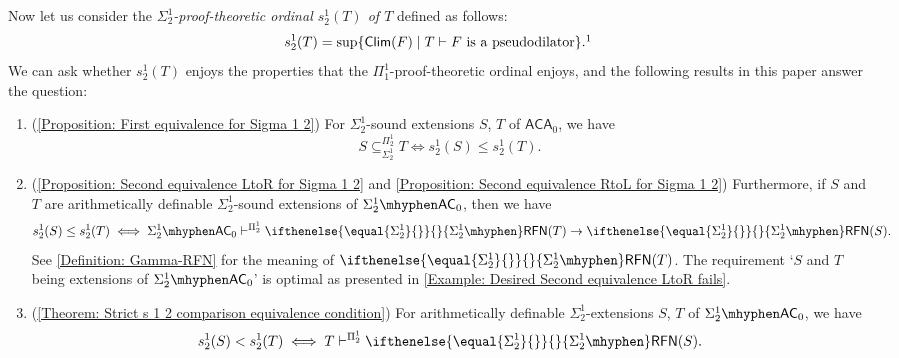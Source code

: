 \documentclass{mhkr}
\newcommand{\added}[1]{#1}
\newcommand{\Clim}{\mathsf{Clim}}
\newcommand{\RFN}[1][]{\ifthenelse{\equal{#1}{}}{}{#1\mhyphen}\mathsf{RFN}}
\newcommand{\AC}{\mathsf{AC}}
\newcommand{\ACA}{\mathsf{ACA}}
\begin{document}
Now let us consider the \emph{$\Sigma^1_2$-proof-theoretic ordinal $s^1_2(T)$ of $T$} defined as follows:
\begin{equation*}
    s^1_2(T) = \sup\{\Clim(F) \mid T\vdash \text{$F$ is a pseudodilator}\}.\footnotemark
\end{equation*}
We can ask whether $s^1_2(T)$ enjoys the properties that the $\Pi^1_1$-proof-theoretic ordinal enjoys, and the following results in this paper answer the question:

\begin{theorem*} \phantom{a}
    \begin{enumerate}
        \item (\autoref{Proposition: First equivalence for Sigma 1 2})  For $\Sigma^1_2$-sound extensions $S$, $T$ of $\ACA_0$, we have
        \begin{equation*}
            S\subseteq^{\Pi^1_2}_{\Sigma^1_2} T\iff s^1_2(S)\le s^1_2(T).
        \end{equation*}
        
        \item (\autoref{Proposition: Second equivalence LtoR for Sigma 1 2} and \autoref{Proposition: Second equivalence RtoL for Sigma 1 2}) Furthermore, if $S$ and $T$ are arithmetically definable $\Sigma^1_2$-sound extensions of $\Sigma^1_2\mhyphen\AC_0$, then we have
        \begin{equation*}
            s^1_2(S)\le s^1_2(T)\iff \Sigma^1_2\mhyphen \AC_0\vdash^{\Pi^1_2} \RFN[\Sigma^1_2](T)\to \RFN[\Sigma^1_2](S).
        \end{equation*}
        See \autoref{Definition: Gamma-RFN} for the meaning of $\RFN[\Sigma^1_2](T)$.        
        The requirement `$S$ and $T$ being extensions of $\Sigma^1_2\mhyphen\AC_0$' is optimal as presented in \autoref{Example: Desired Second equivalence LtoR fails}.
        \item \added{(\autoref{Theorem: Strict s 1 2 comparison equivalence condition}) For arithmetically definable $\Sigma^1_2$-extensions $S$, $T$ of $\Sigma^1_2\mhyphen\AC_0$, we have}
        \begin{equation*}
            \added{s^1_2(S) < s^1_2(T) \iff T \vdash^{\Pi^1_2} \RFN[\Sigma^1_2](S).}
        \end{equation*}
    \end{enumerate}
\end{theorem*}
\end{document}

